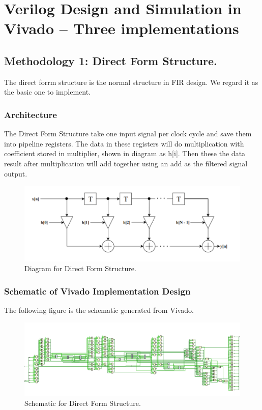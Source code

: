 \documentclass[a4paper]{article}
\begin{document}
\section{Verilog Design and Simulation in Vivado -- Three implementations}
\subsection{Methodology 1: Direct Form Structure.}
The direct forrm structure is the normal structure in FIR design. We regard it as the basic one to implement.
\subsubsection{Architecture}
The Direct Form Structure take one input signal per clock cycle and save them into pipeline registers. The data in these registers will do multiplication with coefficient stored in multiplier, shown in diagram as h[i]. Then these the data result after multiplication will add together using an add as the filtered signal output.
\begin{figure}[H]
    \centering
    \includegraphics[width=1\textwidth]{siyuan/Direct structure.png}
    \caption{Diagram for Direct Form Structure.}
\end{figure}

\subsubsection{Schematic of Vivado Implementation Design}
The following figure is the schematic generated from Vivado.
\begin{figure}[H]
    \centering
    \includegraphics[width=1\textwidth]{siyuan/Direct schematic.png}
    \caption{Schematic for Direct Form Structure.}
\end{figure}
\end{document}
